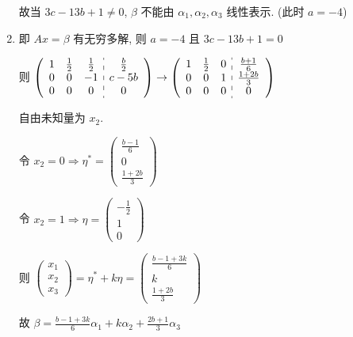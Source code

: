 \begin{enumerate}
			       故当 \( 3c-13b+1 \neq 0 \), \( \beta \) 不能由 \( \alpha_{1}, \alpha_{2}, \alpha_{3} \) 线性表示. (此时 \( a = -4 \))
			 \item %
			       即 \( Ax = \beta \) 有无穷多解, 则 \( a = -4 \) 且 \( 3c-13b+1 = 0 \)

			       则 \( \left(\begin{array}{ccc:c}
					       1 & \frac{1}{2} & \frac{1}{2} & \frac{b}{2} \\
					       0 & 0           & -1          & c-5b        \\
					       0 & 0           & 0           & 0
				       \end{array}\right) \rightarrow \left(\begin{array}{ccc:c}
					       1 & \frac{1}{2} & 0 & \frac{b+1}{6}  \\
					       0 & 0           & 1 & \frac{1+2b}{3} \\
					       0 & 0           & 0 & 0
				       \end{array}\right) \)

			       自由未知量为 \( x_{2} \).

			       令 \( x_{2} = 0 \Rightarrow \eta^{*} = \begin{pmatrix}
				       \frac{b-1}{6} \\
				       0             \\
				       \frac{1+2b}{3}
			       \end{pmatrix} \)

			       令 \( x_{2} = 1 \Rightarrow \eta = \begin{pmatrix}
				       -\frac{1}{2} \\
				       1            \\
				       0
			       \end{pmatrix} \)

			       则 \( \begin{pmatrix}
				       x_{1} \\
				       x_{2} \\
				       x_{3}
			       \end{pmatrix} = \eta^{*} + k\eta = \begin{pmatrix}
				       \frac{b-1+3k}{6} \\
				       k                \\
				       \frac{1+2b}{3}
			       \end{pmatrix} \)

			       故 \( \beta = \frac{b-1+3k}{6}\alpha_{1} + k\alpha_{2} + \frac{2b+1}{3}\alpha_{3} \)
		 \end{enumerate}


